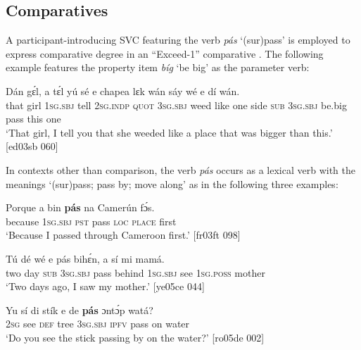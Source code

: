 \subsection{Comparatives}\label{sec:6.9.1}

A participant-introducing\index{} SVC featuring the verb \textit{pás} ‘(sur)pass’ is employed to express comparative degree in an “Exceed-1” comparative \citep{Stassen1985}. The following example features the property item \textit{bíg} ‘be big’ as the parameter verb: 


\ea%
    \label{ex:key:467}
    \gll Dán    gɛ́l,  a    tɛ́l  yú    sé    e    chapea
lɛk  wán    sáy    wé  e            dí  wán.\\
that    girl  \textsc{1sg.sbj}  tell  \textsc{2sg.indp}  \textsc{quot}    \textsc{3sg.sbj}  weed
like  one    side    \textsc{sub}  \textsc{3sg.sbj}  be.big  pass    this  one\\

\glt ‘That girl, I tell you that she weeded like a place that was bigger
than this.’ [ed03sb 060]
\z

In contexts other than comparison, the verb \textit{pás} occurs as a lexical verb with the meanings ‘(sur)pass; pass by; move along’ as in the following three examples: 


\ea%
    \label{ex:key:468}
    \gll Porque  a    bin  \textbf{pás}  na  Camerún    fɔ́s.\\
because  \textsc{1sg.sbj}  \textsc{pst}  pass  \textsc{loc}  \textsc{place}    first\\

\glt ‘Because I passed through Cameroon first.’ [fr03ft 098]
\z


\ea%
    \label{ex:key:469}
    \gll Tú  dé  wé  e    pás  bihɛ́n,  a    sí  mi    mamá.\\
two  day  \textsc{sub}  \textsc{3sg.sbj}  pass  behind  \textsc{1sg.sbj}  see  \textsc{1sg.poss}  mother\\

\glt ‘Two days ago, I saw my mother.’ [ye05ce 044]
\z


\ea%
    \label{ex:key:470}
    \gll Yu  sí  di  stík    e    de  \textbf{pás}  ɔntɔ́p  watá?\\
\textsc{2sg}  see  \textsc{def}  tree    \textsc{3sg.sbj}  \textsc{ipfv}  pass  on    water\\

\glt ‘Do you see the stick passing by on the water?’ [ro05de 002]
\z


